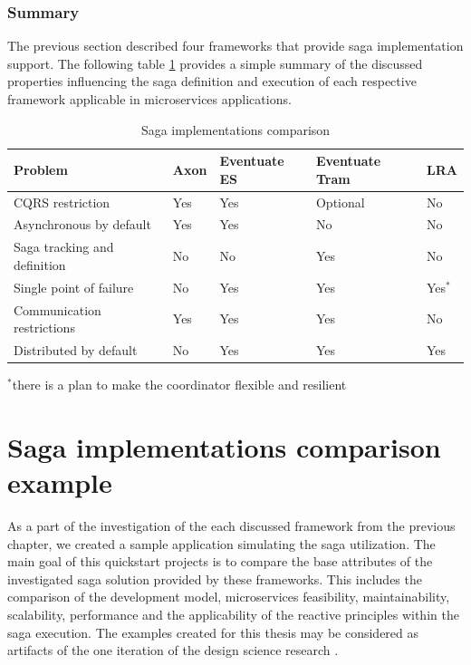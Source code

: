 \documentclass[oneside,
  digital, %
  table,   %
  lof,     %
  lot,     %
]{fithesis3}
\begin{document}
\subsection{Summary}

The previous section described four frameworks that provide saga implementation support. The following table \ref{tab:saga-implementations-comparison} provides a simple summary of the discussed properties influencing the saga definition and execution of each respective framework applicable in microservices applications. 

\begin{table}[ht]
    \begin{tabularx}{\textwidth}{p{4cm}XXXX}
        \toprule
        Problem & Axon & Eventuate ES & Eventuate Tram & LRA\\
        \midrule
        CQRS restriction & Yes & Yes & Optional & No \\
        Asynchronous by \newline default & Yes & Yes & No & No \\
        Saga tracking and \newline definition & No & No & Yes & No\\
        Single point of failure & No & Yes & Yes & Yes$^*$\\
        Communication restrictions & Yes & Yes & Yes & No\\
        Distributed by default & No & Yes & Yes & Yes\\
        \bottomrule
    \end{tabularx}
    \caption{Saga implementations comparison}
    \label{tab:saga-implementations-comparison}
    \bigskip
    $^*$there is a plan to make the coordinator flexible and resilient
\end{table}



\clearpage
\chapter{Saga implementations comparison example}

As a part of the investigation of the each discussed framework from the previous chapter, we created a sample application simulating the saga utilization. The main goal of this quickstart projects is to compare the base attributes of the investigated saga solution provided by these frameworks. This includes the comparison of the development model, microservices feasibility, maintainability, scalability, performance and the applicability of the reactive principles within the saga execution. The examples created for this thesis may be considered as artifacts of the one iteration of the design science research \cite{design_science}.
\end{document}
